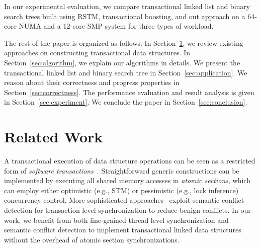 \documentclass[10pt,conference,compsocconf]{IEEEtran}
\begin{document}
In our experimental evaluation, we compare transactional linked list and binary search trees built using RSTM, transactional boosting, and out approach on a 64-core NUMA and a 12-core SMP system for three types of workload. 

The rest of the paper is organized as follows. 
In Section~\ref{sec:related}, we review existing approaches on constructing transactional data structures.
In Section~\ref{sec:algorithm}, we explain our algorithms in details.
We present the transactional linked list and binary search tree in Section~\ref{sec:application}.
We reason about their correctness and progress properties in Section~\ref{sec:correctness}.
The performance evaluation and result analysis is given in Section~\ref{sec:experiment}.
We conclude the paper in Section~\ref{sec:conclusion}.

\section{Related Work}
\label{sec:related}
A transactional execution of data structure operations can be seen as a restricted form of \emph{software transactions}~\cite{harris2010transactional}.
Straightforward generic constructions can be implemented by executing all shared memory accesses in \emph{atomic sections}, which can employ either optimistic (e.g., STM) or pessimistic (e.g., lock inference) concurrency control.
More sophisticated approaches~\cite{bronson2010transactional,herlihy2008transactional,golan2015automatic} exploit semantic conflict detection for transaction level synchronization to reduce benign conflicts.
In our work, we benefit from both fine-grained thread level synchronization and semantic conflict detection to implement transactional linked data structures without the overhead of atomic section synchronizations.
\end{document}
